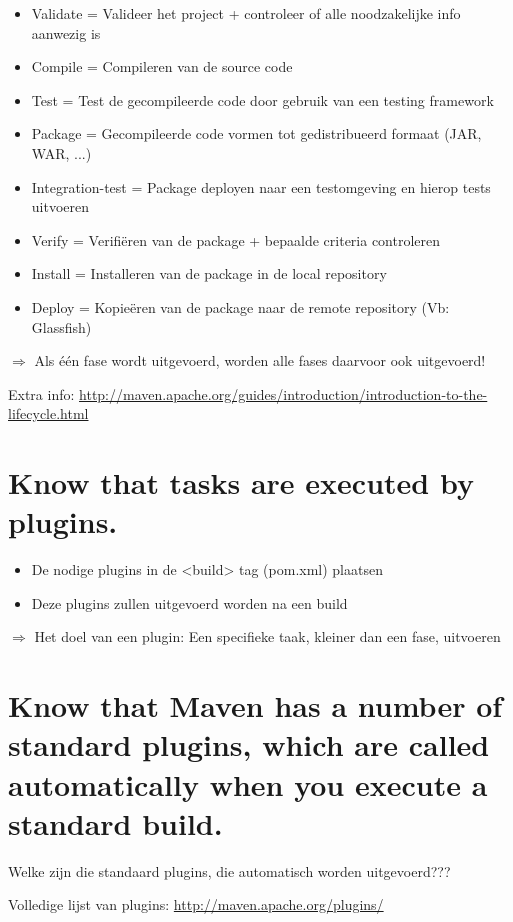 \begin{itemize}
	\item Validate = Valideer het project + controleer of alle noodzakelijke info aanwezig is
	\item Compile = Compileren van de source code
	\item Test = Test de gecompileerde code door gebruik van een testing framework
	\item Package =  Gecompileerde code vormen tot gedistribueerd formaat (JAR, WAR, ...)
	\item Integration-test = Package deployen naar een testomgeving en hierop tests uitvoeren
	\item Verify = Verifiëren van de package + bepaalde criteria controleren
	\item Install = Installeren van de package in de local repository
	\item Deploy = Kopieëren van de package naar de remote repository (Vb: Glassfish)
\end{itemize}

$\Rightarrow$ Als één fase wordt uitgevoerd, worden alle fases daarvoor ook uitgevoerd!

Extra info: \url{http://maven.apache.org/guides/introduction/introduction-to-the-lifecycle.html}

\section{Know that tasks are executed by plugins.}
\begin{itemize}
	\item De nodige plugins in de <build> tag (pom.xml) plaatsen
	\item Deze plugins zullen uitgevoerd worden na een build
\end{itemize}

$\Rightarrow$ Het doel van een plugin: Een specifieke taak, kleiner dan een fase, uitvoeren

\section{Know that Maven has a number of standard plugins, which are called automatically when you execute a standard build.}

Welke zijn die standaard plugins, die automatisch worden uitgevoerd???

Volledige lijst van plugins: \url{http://maven.apache.org/plugins/}

